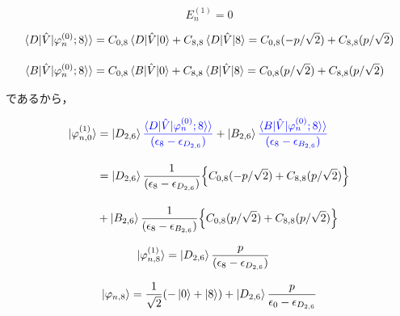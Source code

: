 \begin{equation}
    E^{(1)}_n = 0
\end{equation}

\begin{align}
    \braket{D|\hat{V}|\varphi^{(0)}_n;8}\rangle
    &=C_{0,8}\braket{D|\hat{V}|0} + C_{8,8}\braket{D|\hat{V}|8}
    =C_{0,8}(-p/\sqrt{2}) + C_{8,8} (p/\sqrt{2})\\[10pt]
    \braket{B|\hat{V}|\varphi^{(0)}_n;8}\rangle
    &=C_{0,8}\braket{B|\hat{V}|0} + C_{8,8}\braket{B|\hat{V}|8}
    =C_{0,8}(p/\sqrt{2}) + C_{8,8} (p/\sqrt{2})
\end{align}

であるから，

\begin{align}
    \ket{\varphi_{n,0}^{(1)}}
    &=
    \ket{D_{2,6}}
    \textcolor{blue}{
    \frac{\braket{D|\hat{V}|\varphi^{(0)}_n;8}\rangle}{(\epsilon_{8}-\epsilon_{D_{2,6}})}}
    +
    \ket{B_{2,6}}
    \textcolor{blue}{
    \frac{\braket{B|\hat{V}|\varphi^{(0)}_n;8}\rangle}{(\epsilon_8-\epsilon_{B_{2,6}})}}\\[10pt]
    &=\ket{D_{2,6}}
    \frac{1}{(\epsilon_{8}-\epsilon_{D_{2,6}})}
    \Bigl\{C_{0,8}(-p/\sqrt{2}) + C_{8,8} (p/\sqrt{2})\Bigr\}\nn[10pt]
    &+
    \ket{B_{2,6}}
    \frac{1}{(\epsilon_{8}-\epsilon_{B_{2,6}})}
    \Bigl\{C_{0,8}(p/\sqrt{2}) + C_{8,8} (p/\sqrt{2})\Bigr\}
\end{align}


\begin{align}
    \ket{\varphi_{n,8}^{(1)}}
    &=
    \ket{D_{2,6}}
    \frac{p}{(\epsilon_{8}-\epsilon_{D_{2,6}})}
\end{align}


\begin{equation}
     \ket{\varphi_{n,8}}
     = \frac{1}{\sqrt{2}}(-\ket{0}+\ket{8}) + \ket{D_{2,6}}\frac{p}{\epsilon_0-\epsilon_{D_{2,6}}}
\end{equation}




